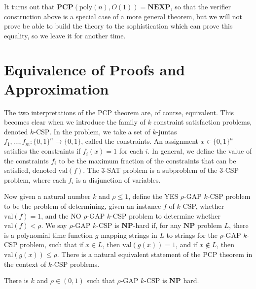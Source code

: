 It turns out that $\mathbf{PCP}(\text{poly}(n), O(1)) = \mathbf{NEXP}$, so that the verifier construction above is a special case of a more general theorem, but we will not prove be able to build the theory to the sophistication which can prove this equality, so we leave it for another time.

\section{Equivalence of Proofs and Approximation}

The two interpretations of the PCP theorem are, of course, equivalent. This becomes clear when we introduce the family of $k$ constraint satisfaction problems, denoted $k$-$\text{CSP}$. In the problem, we take a set of $k$-juntas $f_1, \dots, f_m: \{ 0,1 \}^n \to \{ 0,1 \}$, called the constraints. An assignment $x \in \{ 0, 1 \}^n$ satisfies the constraints if $f_i(x) = 1$ for each $i$. In general, we define the value of the constraints $f_i$ to be the maximum fraction of the constraints that can be satisfied, denoted $\text{val}(f)$. The 3-SAT problem is a subproblem of the 3-CSP problem, where each $f_i$ is a disjunction of variables.

Now given a natural number $k$ and $\rho \leq 1$, define the YES $\rho$-GAP $k$-CSP problem to be the problem of determining, given an instance $f$ of $k$-CSP, whether $\text{val}(f) = 1$, and the NO $\rho$-GAP $k$-CSP problem to determine whether $\text{val}(f) < \rho$. We say $\rho$-GAP $k$-CSP is $\mathbf{NP}$-hard if, for any $\mathbf{NP}$ problem $L$, there is a polynomial time function $g$ mapping strings in $L$ to strings for the $\rho$-GAP $k$-CSP problem, such that if $x \in L$, then $\text{val}(g(x)) = 1$, and if $x \not \in L$, then $\text{val}(g(x)) \leq \rho$. There is a natural equivalent statement of the PCP theorem in the context of $k$-CSP problems.

\begin{theorem}
    There is $k$ and $\rho \in (0,1)$ such that $\rho$-GAP $k$-CSP is $\mathbf{NP}$ hard.
\end{theorem}

